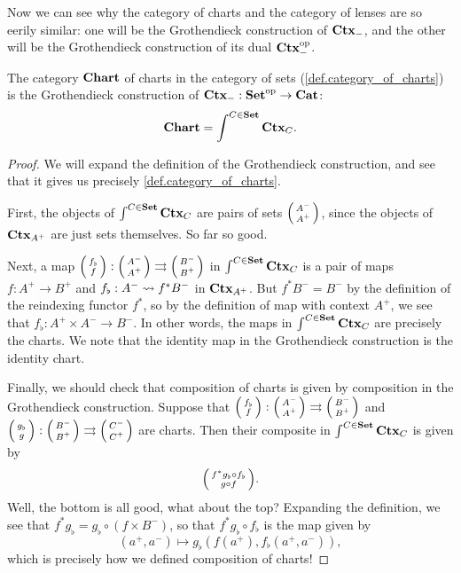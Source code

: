 \documentclass[DynamicalBook]{subfiles}
\begin{document}
Now we can see why the category of charts and the category of lenses are so
eerily similar: one will be the Grothendieck construction of $\textbf{Ctx}_{-}$, and
the other will be the Grothendieck construction of its dual $\textbf{Ctx}_{-}^{\textnormal{op}}$.
\begin{proposition}\label{prop.charts_as_groth_construction}
  The category $\textbf{Chart}$ of charts in the category of sets
  (\cref{def.category_of_charts}) is the Grothendieck construction of $\textbf{Ctx}_{-}
  : \textbf{Set}^{\textnormal{op}} \to \textbf{Cat}$:
  $$\textbf{Chart} = \int^{C \in \textbf{Set}} \textbf{Ctx}_{C}.$$
\end{proposition}
\begin{proof}
  We will expand the definition of the Grothendieck construction, and see that
  it gives us precisely \cref{def.category_of_charts}.

  First, the objects of $\int^{C \in \textbf{Set}} \textbf{Ctx}_{C}$ are pairs of sets
  $\lens{A^-}{A^+}$, since the objects of $\textbf{Ctx}_{A^+}$ are just sets
  themselves. So far so good.

  Next, a map $\lens{f_{\flat}}{f} : \lens{A^-}{A^+} \tto \lens{B^-}{B^+}$
  in $\int^{C \in \textbf{Set}} \textbf{Ctx}_{C}$ is a pair of maps $f : A^+ \to B^+$ and
  $f_{\flat} : A^- \rightsquigarrow f^{\ast} B^-$ in $\textbf{Ctx}_{A^+}$. But $f^{\ast}B^- =
  B^-$ by the definition of the reindexing functor $f^{\ast}$, so by the
  definition of map with context $A^+$, we see that $f_{\flat} : A^+ \times A^-
  \to B^-$. In other words, the maps in $\int^{C \in \textbf{Set}} \textbf{Ctx}_{C}$ are
  precisely the charts. We note that the identity map in the Grothendieck
  construction is the identity chart.

  Finally, we should check that composition of charts is given by composition in
  the Grothendieck construction. Suppose that $\lens{f_{\flat}}{f} :
  \lens{A^-}{A^+} \tto \lens{B^-}{B^+}$ and $\lens{g_{\flat}}{g} :
  \lens{B^-}{B^+} \tto \lens{C^-}{C^+}$ are charts. Then their composite
  in $\int^{C \in \textbf{Set}} \textbf{Ctx}_{C}$ is given by
  $$\lens{f^{\ast}g_{\flat} \circ f_{\flat}}{g \circ f}.$$
  Well, the bottom is all good, what about the top? Expanding the definition, we
  see that $f^{\ast}g_{\flat} = g_{\flat} \circ (f \times B^-)$, so that
  $f^{\ast}g_{\flat} \circ f_{\flat}$ is the map given by
  $$(a^+, a^-) \mapsto g_{\flat}(f(a^+), f_{\flat}(a^+, a^-)),$$
  which is precisely how we defined composition of charts!
\end{proof}
\end{document}
